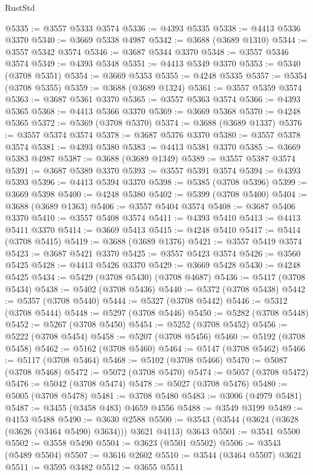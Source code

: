 \begin{lexlean}{RustStd}
\begin{coremodule}
@5335 := @3557 @5333 @3574
@5336 := @4393 @5335
@5338 := @4413 @5336 @3370
@5340 := @3669 @5338 @4987
@5342 := @3688 (@3689 @1310)
@5344 := @3557 @5342 @3574
@5346 := @3687 @5344 @3370
@5348 := @3557 @5346 @3574
@5349 := @4393 @5348
@5351 := @4413 @5349 @3370
@5353 := @5340 (@3708 @5351)
@5354 := @3669 @5353
@5355 := @4248 @5335
@5357 := @5354 (@3708 @5355)
@5359 := @3688 (@3689 @1324)
@5361 := @3557 @5359 @3574
@5363 := @3687 @5361 @3370
@5365 := @3557 @5363 @3574
@5366 := @4393 @5365
@5368 := @4413 @5366 @3370
@5369 := @3669 @5368
@5370 := @4248 @5365
@5372 := @5369 (@3708 @5370)
@5374 := @3688 (@3689 @1337)
@5376 := @3557 @5374 @3574
@5378 := @3687 @5376 @3370
@5380 := @3557 @5378 @3574
@5381 := @4393 @5380
@5383 := @4413 @5381 @3370
@5385 := @3669 @5383 @4987
@5387 := @3688 (@3689 @1349)
@5389 := @3557 @5387 @3574
@5391 := @3687 @5389 @3370
@5393 := @3557 @5391 @3574
@5394 := @4393 @5393
@5396 := @4413 @5394 @3370
@5398 := @5385 (@3708 @5396)
@5399 := @3669 @5398
@5400 := @4248 @5380
@5402 := @5399 (@3708 @5400)
@5404 := @3688 (@3689 @1363)
@5406 := @3557 @5404 @3574
@5408 := @3687 @5406 @3370
@5410 := @3557 @5408 @3574
@5411 := @4393 @5410
@5413 := @4413 @5411 @3370
@5414 := @3669 @5413
@5415 := @4248 @5410
@5417 := @5414 (@3708 @5415)
@5419 := @3688 (@3689 @1376)
@5421 := @3557 @5419 @3574
@5423 := @3687 @5421 @3370
@5425 := @3557 @5423 @3574
@5426 := @3560 @5425
@5428 := @4413 @5426 @3370
@5429 := @3669 @5428
@5430 := @4248 @5425
@5434 := @5429 (@3708 @5430) (@3708 @4687)
@5436 := @5417 (@3708 @5434)
@5438 := @5402 (@3708 @5436)
@5440 := @5372 (@3708 @5438)
@5442 := @5357 (@3708 @5440)
@5444 := @5327 (@3708 @5442)
@5446 := @5312 (@3708 @5444)
@5448 := @5297 (@3708 @5446)
@5450 := @5282 (@3708 @5448)
@5452 := @5267 (@3708 @5450)
@5454 := @5252 (@3708 @5452)
@5456 := @5222 (@3708 @5454)
@5458 := @5207 (@3708 @5456)
@5460 := @5192 (@3708 @5458)
@5462 := @5162 (@3708 @5460)
@5464 := @5147 (@3708 @5462)
@5466 := @5117 (@3708 @5464)
@5468 := @5102 (@3708 @5466)
@5470 := @5087 (@3708 @5468)
@5472 := @5072 (@3708 @5470)
@5474 := @5057 (@3708 @5472)
@5476 := @5042 (@3708 @5474)
@5478 := @5027 (@3708 @5476)
@5480 := @5005 (@3708 @5478)
@5481 := @3708 @5480
@5483 := @3006 (@4979 @5481)
@5487 := @3455 (@3458 @483) @4659 @4556
@5488 := @3549 @3199
@5489 := @4153 @5488
@5490 := @3630 @2588
@5500 := @3543 (@3544 (@3624 (@3628 (@3626 (@3464 @5490) @3634))) @3621 @4113) @3643
@5501 := @3541 @5500
@5502 := @3558 @5490
@5504 := @3623 (@5501 @5502)
@5506 := @3543 (@5489 @5504)
@5507 := @3616 @2602
@5510 := @3544 (@3464 @5507) @3621
@5511 := @3595 @3482
@5512 := @3655 @5511

\end{coremodule}
\end{lexlean}
